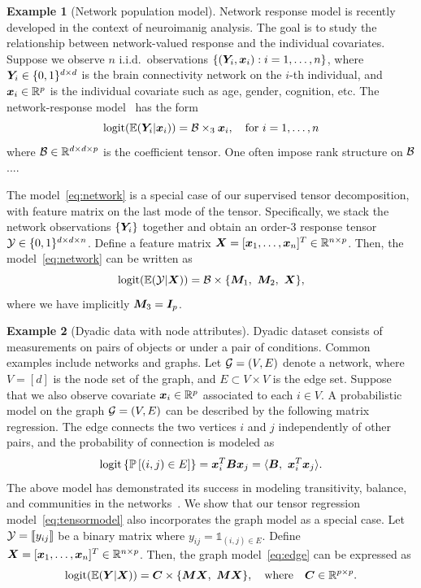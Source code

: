 \documentclass[12pt]{article}
\theoremstyle{plain}
\theoremstyle{definition}
\newtheorem{example}{Example}
\begin{document}
\begin{example}[Network population model] 
Network response model is recently developed in the context of neuroimanig analysis. The goal is to study the relationship between network-valued response and the individual covariates. Suppose we observe $n$ i.i.d.\ observations $\{(\bm Y_i, \bm x_i): i=1,\ldots,n\}$, where $\bm Y_i\in\{0,1\}^{d\times d}$ is the brain connectivity network on the $i$-th individual, and $\bm x_i\in\mathbb{R}^p$ is the individual covariate such as age, gender, cognition, etc. The network-response model~\citep{rabusseau2016low, zhang2018network} has the form
\begin{equation}\label{eq:network}
\text{logit}(\mathbb{E}(\bm Y_i|\bm x_i))=\mathcal{B}\times_3\bm x_i, \quad \text{for }i=1,\ldots,n
\end{equation}
where $\mathcal{B}\in \mathbb{R}^{d\times d\times p}$ is the coefficient tensor. {\color{red}One often impose rank structure on $\mathcal{B}$.... }

The model~\eqref{eq:network} is a special case of our supervised tensor decomposition, with feature matrix on the last mode of the tensor. Specifically, we stack the network observations $\{\bm Y_i\}$ together and obtain an order-3 response tensor $\mathcal{Y}\in\{0,1\}^{d\times d\times n}$. Define a feature matrix $\bm X=[\bm x_1,\ldots,\bm x_n]^T\in\mathbb{R}^{n\times p}$. Then, the model~\eqref{eq:network} can be written as
\[
\text{logit}(\mathbb{E}(\tY|\mX))=\tB\times\{\mM_1,\ \mM_2,\ \mX\},
\]
where we have implicitly $\bm M_3=\bm I_p$.
 \end{example}
 
 \begin{example}[Dyadic data with node attributes] Dyadic dataset consists of measurements on pairs of objects or under a pair of conditions. Common examples include networks and graphs. Let $\mathcal{G}=(V,E)$ denote a network, where $V=[d]$ is the node set of the graph, and $E\subset V\times V$ is the edge set. Suppose that we also observe covariate $\bm x_i\in\mathbb{R}^p$ associated to each $i\in V$. A probabilistic model on the graph $\mathcal{G}=(V,E)$ can be described by the following matrix regression. The edge connects the two vertices $i$ and $j$ independently of other pairs, and the probability of connection is modeled as
\begin{equation}\label{eq:edge}
 \text{logit}\left\{\mathbb{P}\left[(i,j)\in E\right]\right\}=\mx^T_i\mB\mx_j=\langle \mB,\ \mx^T_i\mx_j\rangle.
 \end{equation}
The above model has demonstrated its success in modeling transitivity, balance, and communities in the networks~\citep{hoff2005bilinear}. We show that our tensor regression model~\eqref{eq:tensormodel} also incorporates the graph model as a special case. Let $\mathcal{Y}=\llbracket y_{ij} \rrbracket$ be a binary matrix where $y_{ij}=\mathds{1}_{(i,j)\in E}$. Define $\bm X=[\bm x_1,\ldots,\bm x_n]^T\in\mathbb{R}^{n\times p}$. Then, the graph model~\eqref{eq:edge} can be expressed as
 \[
 \text{logit}(\mathbb{E}(\mY|\mX))=\mC\times\{\mM\mX,\ \mM\mX\}, \quad \text{where}\quad \mC\in\mathbb{R}^{p\times p}.
 \]
\end{example}
\end{document}
